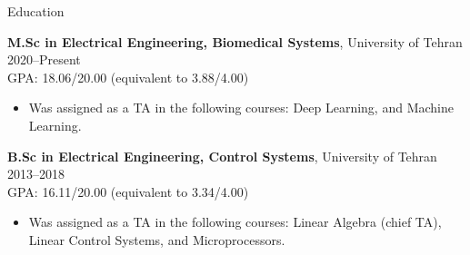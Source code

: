 \documentclass{resume} %
\begin{document}
	
	\begin{rSection}{Education}
		
		{\bf M.Sc in Electrical Engineering, Biomedical Systems}, University of Tehran \hfill {2020--Present}\\
		GPA: 18.06/20.00 (equivalent to 3.88/4.00)
		\begin{itemize}
			\item Was assigned as a TA in the following courses: Deep Learning, and Machine Learning.
		\end{itemize}	

		\vspace{3pt}
		
		{\bf B.Sc in Electrical Engineering, Control Systems}, University of Tehran \hfill {2013--2018}\\
		GPA: 16.11/20.00 (equivalent to 3.34/4.00)
			\begin{itemize}
			\item Was assigned as a TA in the following courses: Linear Algebra (chief TA), Linear Control Systems, and Microprocessors.
		\end{itemize}	
			
		
	\end{rSection}
	
\end{document}
